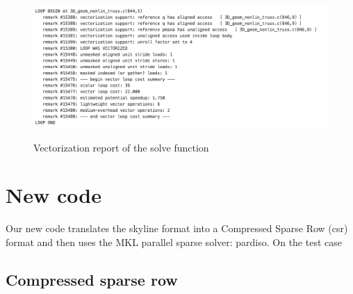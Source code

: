 \documentclass[11pt]{article}
\begin{document}
\begin{figure}[H]
	\begin{center}
		
		\caption{Vectorization report of the solve function}
		\includegraphics[width=12cm]{vectorization}
		\label{fig:vectorization}
	\end{center}
	
\end{figure}


\section{New code}
Our new code translates the skyline format into a Compressed Sparse Row (csr) format and then uses the MKL parallel sparse solver: pardiso. On the test case 

\subsection{Compressed sparse row}
\end{document}
